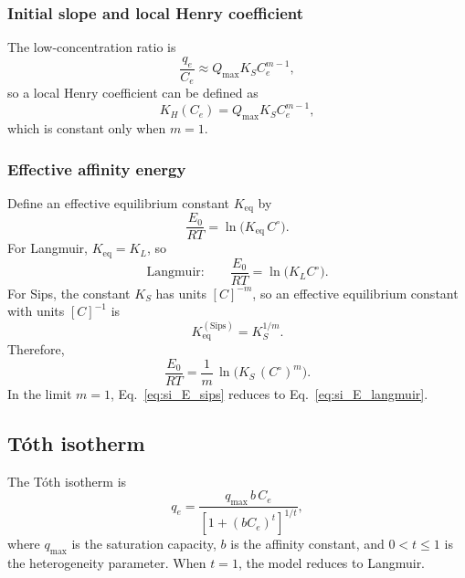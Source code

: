 \documentclass[journal=jacsat,manuscript=article]{achemso}
\begin{document}
\subsubsection{Initial slope and local Henry coefficient}

The low-concentration ratio is
\begin{equation}
	\frac{q_e}{C_e}
	\approx Q_{\max} K_S C_e^{m-1},
\end{equation}
so a local Henry coefficient can be defined as
\begin{equation}
	K_H(C_e) = Q_{\max} K_S C_e^{m - 1},
\end{equation}
which is constant only when \(m = 1\).

\subsubsection{Effective affinity energy}

Define an effective equilibrium constant \(K_{\mathrm{eq}}\) by
\begin{equation}
	\frac{E_0}{RT} = \ln\!\big(K_{\mathrm{eq}}\,C^\circ\big).
	\label{eq:si_E_def}
\end{equation}
For Langmuir, \(K_{\mathrm{eq}} = K_L\), so
\begin{equation}
	\text{Langmuir:}\qquad
	\frac{E_0}{RT} = \ln\!\big(K_L C^\circ\big).
	\label{eq:si_E_langmuir}
\end{equation}
For Sips, the constant \(K_S\) has units \([C]^{-m}\), so an effective
equilibrium constant with units \([C]^{-1}\) is
\begin{equation}
	K_{\mathrm{eq}}^{\mathrm{(Sips)}} = K_S^{1/m}.
\end{equation}
Therefore,
\begin{equation}
	\frac{E_0}{RT}
	= \frac{1}{m}\,\ln\!\big(K_S\,(C^\circ)^{m}\big).
	\label{eq:si_E_sips}
\end{equation}
In the limit \(m = 1\), Eq.~\eqref{eq:si_E_sips} reduces to
Eq.~\eqref{eq:si_E_langmuir}.

\subsection{T\'{o}th isotherm}
\label{sec:si_toth}

The T\'{o}th isotherm is
\begin{equation}
	q_e = \frac{q_{\max}\, b\, C_e}{\left[1 + (b C_e)^t\right]^{1/t}},
	\label{eq:si_toth}
\end{equation}
where $q_{\max}$ is the saturation capacity, $b$ is the affinity
constant, and $0 < t \leq 1$ is the heterogeneity parameter.
When $t = 1$, the model reduces to Langmuir.
\end{document}
